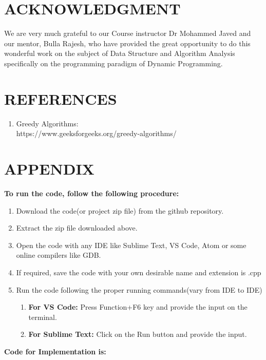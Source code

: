 \documentclass[10pt]{article}
\begin{document}
\begin{multicols*}{2}
\section*{ACKNOWLEDGMENT}

We are very much grateful to our Course instructor Dr Mohammed Javed and our mentor, Bulla Rajesh, who have provided the great opportunity to do this wonderful work on the subject of Data Structure and Algorithm Analysis specifically on the programming paradigm of Dynamic Programming.

\section*{REFERENCES}

\begin{enumerate}
\item Greedy Algorithms:\\
https://www.geeksforgeeks.org/greedy-algorithms/
\end{enumerate}
\end{multicols*}

\newpage
\section*{APPENDIX}
\textbf{To run the code, follow the following procedure:}\\
\begin{enumerate}
    \item Download the code(or project zip file) from the github repository.
    \item Extract the zip file downloaded above.
    \item Open the code with any IDE like Sublime Text, VS Code, Atom or some online compilers like GDB.
    \item If required, save the code with your own desirable name and extension is .cpp
    \item Run the code following the proper running commands(vary from IDE to IDE)
    \begin{enumerate}
        \item \textbf{For VS Code:} Press Function+F6 key and provide the input on the terminal.
        \item \textbf{For Sublime Text:} Click on the Run button and provide the input.\\
    \end{enumerate}
\end{enumerate}
\textbf{Code for Implementation is:}
\end{document}
